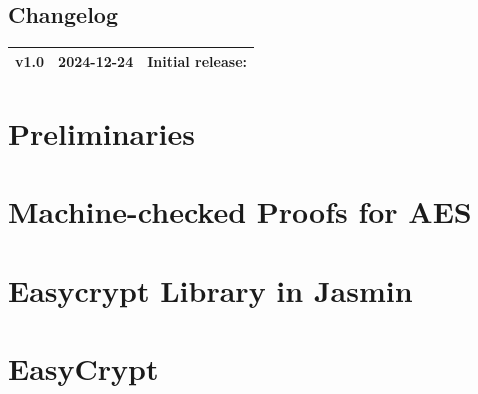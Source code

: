 \documentclass[11pt,openany]{article}
\begin{document}
\vfill
\subsection*{Changelog}
\large
\begin{tabular}{@{} L{0.05\textwidth} L{0.2\textwidth} L{0.7\textwidth} @{}} %
	\toprule
	v1.0 & 2024-12-24 & Initial release: \\%
	\bottomrule
\end{tabular}

\newpage


\tableofcontents
\newpage
\section{Preliminaries}


\newpage
%

\newpage
\section{Machine-checked Proofs for AES}


\newpage
\section{Easycrypt Library in Jasmin}


\newpage
\section{EasyCrypt}


%
\end{document}
